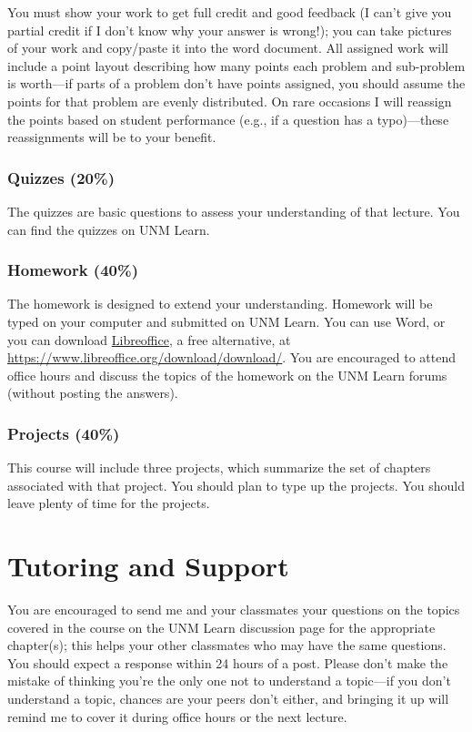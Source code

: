 \documentclass[12pt]{article}
\begin{document}
You must show your work to get full credit and good feedback (I can’t give you partial credit if I don’t know why your answer is wrong!); you can take pictures of your work and copy/paste it into the word document.  All assigned work will include a point layout describing how many points each problem and sub-problem is worth---if parts of a problem don’t have points assigned, you should assume the points for that problem are evenly distributed.  On rare occasions I will reassign the points based on student performance (e.g., if a question has a typo)---these reassignments will be to your benefit.
\subsubsection*{Quizzes (20\%)}
The quizzes are basic questions to assess your understanding of that lecture.  You can find the quizzes on UNM Learn.
\subsubsection*{Homework (40\%)}
The homework is designed to extend your understanding.  Homework will be typed on your computer and submitted on UNM Learn.  You can use Word, or you can download \href{https://www.libreoffice.org/download/download/}{Libreoffice}, a free alternative, at \url{https://www.libreoffice.org/download/download/}.  You are encouraged to attend office hours and discuss the topics of the homework on the UNM Learn forums (without posting the answers).
\subsubsection*{Projects (40\%)}
This course will include three projects, which summarize the set of chapters associated with that project.  You should plan to type up the projects.  You should leave plenty of time for the projects.
\newpage

\section*{Tutoring and Support}
You are encouraged to send me and your classmates your questions on the topics covered in the course on the UNM Learn discussion page for the appropriate chapter(s); this helps your other classmates who may have the same questions.  You should expect a response within 24 hours of a post.  Please don't make the mistake of thinking you're the only one not to understand a topic---if you don't understand a topic, chances are your peers don't either, and bringing it up will remind me to cover it during office hours or the next lecture.
\end{document}
